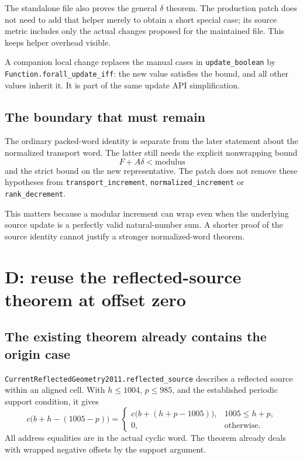 \documentclass[11pt,letterpaper]{article}
\newcommand{\code}[1]{\nolinkurl{#1}}
\begin{document}
The standalone file also proves the general \(\delta\) theorem. The production patch does not need to add that helper merely to obtain a short special case; its source metric includes only the actual changes proposed for the maintained file. This keeps helper overhead visible.

A companion local change replaces the manual cases in \code{update_boolean} by \code{Function.forall_update_iff}: the new value satisfies the bound, and all other values inherit it. It is part of the same update API simplification.

\subsection{The boundary that must remain}

The ordinary packed-word identity is separate from the later statement about the normalized transport word. The latter still needs the explicit nonwrapping bound
\[
 F+A\delta<\mathrm{modulus}
\]
and the strict bound on the new representative. The patch does not remove these hypotheses from \code{transport_increment}, \code{normalized_increment} or \code{rank_decrement}.

This matters because a modular increment can wrap even when the underlying source update is a perfectly valid natural-number sum. A shorter proof of the source identity cannot justify a stronger normalized-word theorem.

\section{D: reuse the reflected-source theorem at offset zero}

\subsection{The existing theorem already contains the origin case}

\code{CurrentReflectedGeometry2011.reflected_source} describes a reflected source within an aligned cell. With \(h\le1004\), \(p\le985\), and the established periodic support condition, it gives
\[
 c\bigl(b+h-(1005-p)\bigr)=
 \begin{cases}
 c\bigl(b+(h+p-1005)\bigr),&1005\le h+p,\\
 0,&\text{otherwise}.
 \end{cases}
\]
All address equalities are in the actual cyclic word. The theorem already deals with wrapped negative offsets by the support argument.
\end{document}
